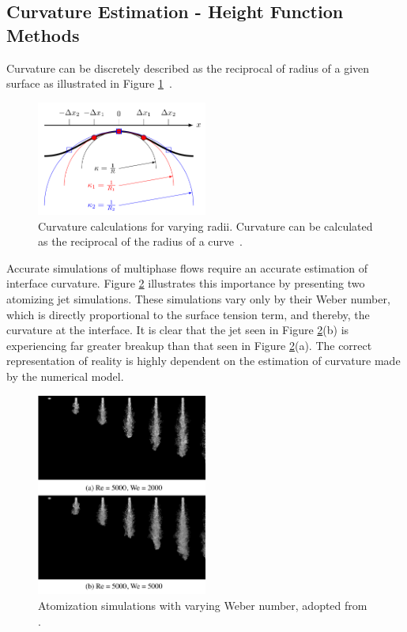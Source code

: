 
\subsection{Curvature Estimation - Height Function Methods}

Curvature can be discretely described as the reciprocal of radius of a given surface as illustrated in Figure \ref{fig:curv}~\cite{Owkes2018}. 
 \begin{figure}[htbp]
	\centering
	\includegraphics[width=0.5\textwidth]{figs/curv}
	\caption{Curvature calculations for varying radii. Curvature can be calculated as the reciprocal of the radius of a curve~\cite{Owkes2018}.}
	\label{fig:curv}
\end{figure}
Accurate simulations of multiphase flows require an accurate estimation of interface curvature. Figure \ref{fig:surf} illustrates this importance by presenting two atomizing jet simulations. These simulations vary only by their Weber number, which is directly proportional to the surface tension term, and thereby, the curvature at the interface. It is clear that the jet seen in Figure \ref{fig:surf}(b) is experiencing far greater breakup than that seen in Figure \ref{fig:surf}(a). The correct representation of reality is highly dependent on the estimation of curvature made by the numerical model. 
 \begin{figure}[htbp]
	\centering
	\includegraphics[width=0.5\textwidth]{figs/surf}
	\caption{Atomization simulations with varying Weber number, adopted from \cite{Desjardins13}.}
	\label{fig:surf}
\end{figure}
